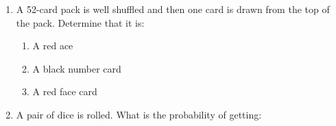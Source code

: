 \begin{enumerate}
\item A 52-card pack is well shuffled and then one card is drawn from the top of the pack. Determine that it is: 
\begin{enumerate}
\item  A red ace
\item  A black number card 
\item  A red face card
\end{enumerate} 
\item A pair of dice is rolled. What is the probability of getting: 
\begin{enumerate}
\end{enumerate} 
\end{enumerate}  

